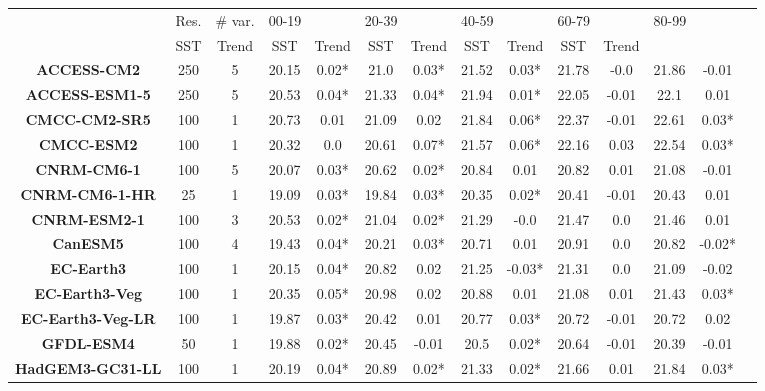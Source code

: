 \begin{tabular}{|c|c|c|c|c|c|c|c|c|c|c|c|c|c|}
\toprule
{} & Res. & \# var. & \multicolumn{2}{l}{00-19} & \multicolumn{2}{l}{20-39} & \multicolumn{2}{l}{40-59} & \multicolumn{2}{l}{60-79} & \multicolumn{2}{l}{80-99} \\
{} &    SST &  Trend &    SST &  Trend &    SST &   Trend &    SST &   Trend &    SST &   Trend \\
\midrule
\textbf{ACCESS-CM2      } &  250 &      5 &  20.15 &  0.02* &   21.0 &  0.03* &  21.52 &   0.03* &  21.78 &    -0.0 &  21.86 &   -0.01 \\
\textbf{ACCESS-ESM1-5   } &  250 &      5 &  20.53 &  0.04* &  21.33 &  0.04* &  21.94 &   0.01* &  22.05 &   -0.01 &   22.1 &    0.01 \\
\textbf{CMCC-CM2-SR5    } &  100 &      1 &  20.73 &   0.01 &  21.09 &   0.02 &  21.84 &   0.06* &  22.37 &   -0.01 &  22.61 &   0.03* \\
\textbf{CMCC-ESM2       } &  100 &      1 &  20.32 &    0.0 &  20.61 &  0.07* &  21.57 &   0.06* &  22.16 &    0.03 &  22.54 &   0.03* \\
\textbf{CNRM-CM6-1      } &  100 &      5 &  20.07 &  0.03* &  20.62 &  0.02* &  20.84 &    0.01 &  20.82 &    0.01 &  21.08 &   -0.01 \\
\textbf{CNRM-CM6-1-HR   } &   25 &      1 &  19.09 &  0.03* &  19.84 &  0.03* &  20.35 &   0.02* &  20.41 &   -0.01 &  20.43 &    0.01 \\
\textbf{CNRM-ESM2-1     } &  100 &      3 &  20.53 &  0.02* &  21.04 &  0.02* &  21.29 &    -0.0 &  21.47 &     0.0 &  21.46 &    0.01 \\
\textbf{CanESM5         } &  100 &      4 &  19.43 &  0.04* &  20.21 &  0.03* &  20.71 &    0.01 &  20.91 &     0.0 &  20.82 &  -0.02* \\
\textbf{EC-Earth3       } &  100 &      1 &  20.15 &  0.04* &  20.82 &   0.02 &  21.25 &  -0.03* &  21.31 &     0.0 &  21.09 &   -0.02 \\
\textbf{EC-Earth3-Veg   } &  100 &      1 &  20.35 &  0.05* &  20.98 &   0.02 &  20.88 &    0.01 &  21.08 &    0.01 &  21.43 &   0.03* \\
\textbf{EC-Earth3-Veg-LR} &  100 &      1 &  19.87 &  0.03* &  20.42 &   0.01 &  20.77 &   0.03* &  20.72 &   -0.01 &  20.72 &    0.02 \\
\textbf{GFDL-ESM4       } &   50 &      1 &  19.88 &  0.02* &  20.45 &  -0.01 &   20.5 &   0.02* &  20.64 &   -0.01 &  20.39 &   -0.01 \\
\textbf{HadGEM3-GC31-LL } &  100 &      1 &  20.19 &  0.04* &  20.89 &  0.02* &  21.33 &   0.02* &  21.66 &    0.01 &  21.84 &   0.03* \\

\end{tabular}

